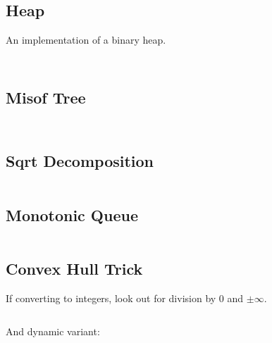 \documentclass[8pt,a4paper,landscape,oneside]{amsart}
\newcommand{\code}[1]{\inputminted[fontsize=\normalsize,baselinestretch=1]{cpp}{_code/#1}}
\newif\ifverbose
\begin{document}
\begin{multicols*}{3}
    \subsection{Heap}
        An implementation of a binary heap.
        \code{data-structures/heap.cpp}
    \fi

    \ifverbose
    \subsection{Dancing Links}
        \ifverbose
        An implementation of Donald Knuth's Dancing Links data structure. A
        linked list supporting deletion and restoration of elements.
        \fi
        \code{data-structures/dancing_links.cpp}
    \fi

    \subsection{Misof Tree}
        \ifverbose
        A simple tree data structure for inserting, erasing, and querying the
        $n$th largest element.
        \fi
        \code{data-structures/misof_tree.cpp}

    \ifverbose
    \subsection{$k$-d Tree}
        \ifverbose
        A $k$-dimensional tree supporting fast construction, adding points, and
        nearest neighbor queries.
        \fi
        \code{data-structures/kd_tree.cpp}
    \fi

    \subsection{Sqrt Decomposition}
        \ifverbose
        Design principle that supports many operations in amortized $\sqrt{n}$ per operation.
        \fi
        \code{data-structures/sqrt_decomposition.cpp}

    \subsection{Monotonic Queue}
        \ifverbose
        A queue that supports querying for the minimum element. Useful for sliding window algorithms.
        \fi
        \code{data-structures/monotonic_queue.cpp}

    \subsection{Convex Hull Trick}
        If converting to integers, look out for division by 0 and $\pm\infty$.
        \code{data-structures/convex_hull_trick.cpp}
        And dynamic variant:
        \code{data-structures/convex_hull_trick_dynamic.cpp}


\end{multicols*}
\end{document}

